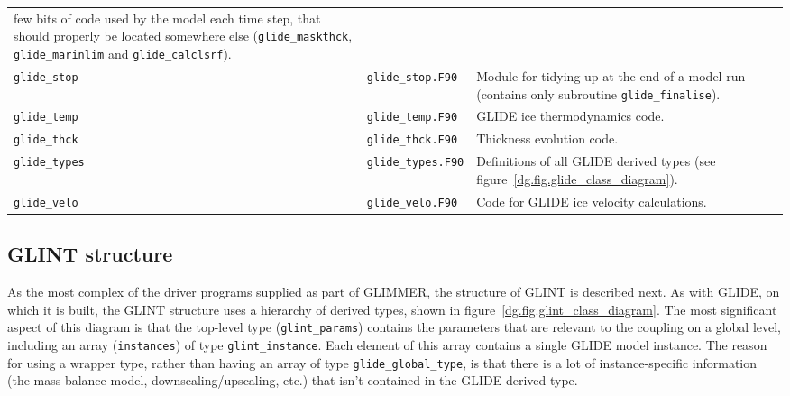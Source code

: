 \begin{center}
\begin{supertabular}{|l|l|p{7cm}|}
    few bits of code used by the model each time step, that should properly be
    located somewhere else (\texttt{glide\_maskthck},
    \texttt{glide\_marinlim} and \texttt{glide\_calclsrf}).\\
    \texttt{glide\_stop} & \texttt{glide\_stop.F90} & Module for tidying up at
    the end of a model run (contains only subroutine \texttt{glide\_finalise}).\\
    \texttt{glide\_temp} & \texttt{glide\_temp.F90} & GLIDE ice thermodynamics
    code. \\
    \texttt{glide\_thck} & \texttt{glide\_thck.F90} & Thickness evolution
    code. \\
    \texttt{glide\_types} & \texttt{glide\_types.F90} & Definitions of all
    GLIDE derived types (see figure~\ref{dg.fig.glide_class_diagram}).\\
    \texttt{glide\_velo} & \texttt{glide\_velo.F90} & Code for GLIDE ice
    velocity calculations. \\

  \end{supertabular}
\end{center}

\subsection{GLINT structure}
%
As the most complex of the driver programs supplied as part of GLIMMER, the
structure of GLINT is described next. As with GLIDE, on which it is built, the
GLINT structure uses a hierarchy of derived types, shown in
figure~\ref{dg.fig.glint_class_diagram}. The most significant aspect of this
diagram is that the top-level type (\texttt{glint\_params}) contains the
parameters that are relevant to the coupling on a global level, including an
array (\texttt{instances}) of type \texttt{glint\_instance}. Each element of
this array contains a single GLIDE model instance. The reason for using a
wrapper type, rather than having an array of type \texttt{glide\_global\_type},
is that there is a lot of instance-specific information (the mass-balance
model, downscaling/upscaling, etc.) that isn't contained in the GLIDE derived
type.

